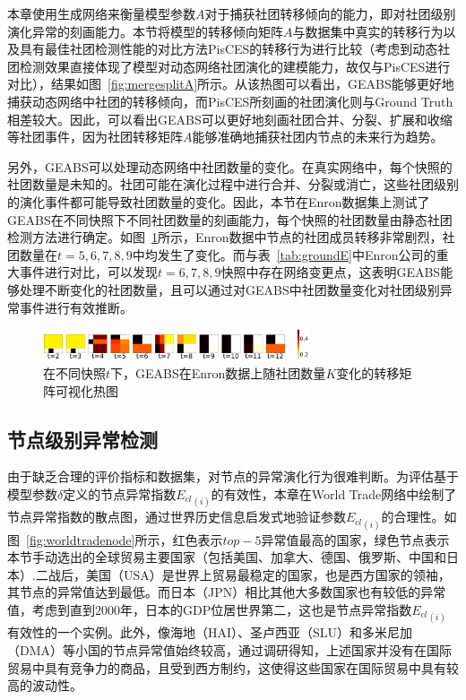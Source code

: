 本章使用生成网络来衡量模型参数$A$对于捕获社团转移倾向的能力，即对社团级别演化异常的刻画能力。本节将模型的转移倾向矩阵$A$与数据集中真实的转移行为以及具有最佳社团检测性能的对比方法PisCES的转移行为进行比较（考虑到动态社团检测效果直接体现了模型对动态网络社团演化的建模能力，故仅与PisCES进行对比），结果如图~\ref{fig:mergesplitA}所示。从该热图可以看出，GEABS能够更好地捕获动态网络中社团的转移倾向，而PisCES所刻画的社团演化则与Ground Truth相差较大。因此，可以看出GEABS可以更好地刻画社团合并、分裂、扩展和收缩等社团事件，因为社团转移矩阵$A$能够准确地捕获社团内节点的未来行为趋势。




另外，GEABS可以处理动态网络中社团数量的变化。在真实网络中，每个快照的社团数量是未知的。社团可能在演化过程中进行合并、分裂或消亡，这些社团级别的演化事件都可能导致社团数量的变化。因此，本节在Enron数据集上测试了GEABS在不同快照下不同社团数量的刻画能力，每个快照的社团数量由静态社团检测方法进行确定。如图~\ref{fig:enronTransA}所示，Enron数据中节点的社团成员转移非常剧烈，社团数量在$t=5,6,7,8,9$中均发生了变化。而与表~\ref{tab:groundE}中Enron公司的重大事件进行对比，可以发现$t=6,7,8,9$快照中存在网络变更点，这表明GEABS能够处理不断变化的社团数量，且可以通过对GEABS中社团数量变化对社团级别异常事件进行有效推断。
 
 \begin{figure}[!htbp]
 	\centering
 	\includegraphics[width=0.7\textwidth]{figures/chap05/EnronTransA-heatmap.pdf}
 	\caption{在不同快照$t$下，GEABS在Enron数据上随社团数量$K$变化的转移矩阵可视化热图}
 	\label{fig:enronTransA}
 \end{figure}
 
 
\subsection{节点级别异常检测}


由于缺乏合理的评价指标和数据集，对节点的异常演化行为很难判断。为评估基于模型参数$\delta$定义的节点异常指数${E_{cl}}_{(i)}$的有效性，本章在World Trade网络中绘制了节点异常指数的散点图，通过世界历史信息启发式地验证参数${E_{cl}}_{(i)}$的合理性。如图~\ref{fig:worldtradenode}所示，红色表示$top-5$异常值最高的国家，绿色节点表示本节手动选出的全球贸易主要国家（包括美国、加拿大、德国、俄罗斯、中国和日本）.二战后，美国（USA）是世界上贸易最稳定的国家，也是西方国家的领袖，其节点的异常值达到最低。而日本（JPN）相比其他大多数国家也有较低的异常值，考虑到直到$2000$年，日本的GDP位居世界第二，这也是节点异常指数${E_{cl}}_{(i)}$有效性的一个实例。此外，像海地（HAI）、圣卢西亚（SLU）和多米尼加（DMA）等小国的节点异常值始终较高，通过调研得知，上述国家并没有在国际贸易中具有竞争力的商品，且受到西方制约，这使得这些国家在国际贸易中具有较高的波动性。


